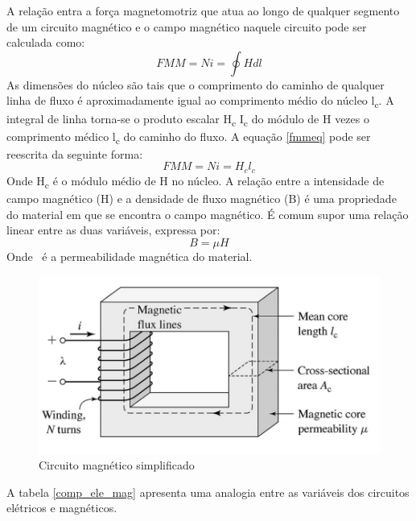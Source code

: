 A relação entra a força magnetomotriz que atua ao longo de qualquer segmento de um circuito magnético e o campo magnético naquele circuito pode ser calculada como:
\begin{equation}
\label{fmmeq}
FMM = Ni = \oint H dl
\end{equation}
As dimensões do núcleo são tais que o comprimento do caminho de qualquer linha de fluxo é aproximadamente igual ao comprimento médio do núcleo l\textsubscript{c}. A integral de linha torna-se o produto escalar H\textsubscript{c} I\textsubscript{c} do módulo de H vezes o comprimento médico l\textsubscript{c} do caminho do fluxo. A equação \ref{fmmeq} pode ser reescrita da seguinte forma:
\begin{equation}
FMM = Ni = H_{c}l_{c}
\end{equation}
Onde H\textsubscript{c} é o módulo médio de H no núcleo.
A relação entre a intensidade de campo magnético (H) e a densidade de fluxo magnético (B) é uma propriedade do material em que se encontra o campo magnético. É comum supor uma relação linear entre as duas variáveis, expressa por:
\begin{equation}
B = \mu H
\end{equation}
Onde \textmu \ é a permeabilidade magnética do material.
\begin{figure}[H]
\centering
\includegraphics[scale=0.55]{img/assig1/simple_magnetic_circuit.png}
\caption[Circuito magnético simplificado]{Circuito magnético simplificado}
\label{circ_mag_simp}
\end{figure}
A tabela \ref{comp_ele_mag} apresenta uma analogia entre as variáveis dos circuitos elétricos e magnéticos.
